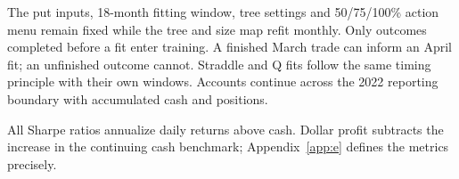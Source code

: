 The put inputs, 18-month fitting window, tree settings and 50/75/100\% action menu remain fixed while the tree and size map refit monthly. Only outcomes completed before a fit enter training. A finished March trade can inform an April fit; an unfinished outcome cannot. Straddle and Q fits follow the same timing principle with their own windows. Accounts continue across the 2022 reporting boundary with accumulated cash and positions.


All Sharpe ratios annualize daily returns above cash. Dollar profit subtracts the increase in the continuing cash benchmark; Appendix~\ref{app:e} defines the metrics precisely.
